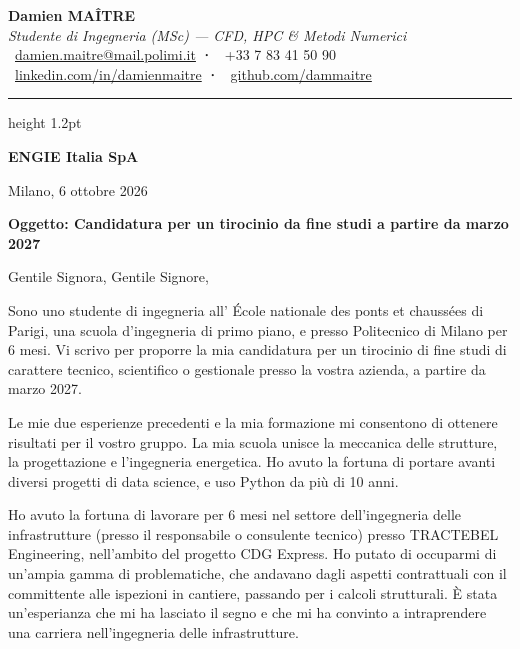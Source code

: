 \documentclass[a4paper,11pt]{extarticle}
\newcommand{\azienda}{ENGIE Italia SpA}
\begin{document}
\begin{center}
  {\LARGE\bfseries\color{accent} Damien MAÎTRE}\\[2pt]
  {\normalsize\textit{\textcolor{muted}{Studente di Ingegneria (MSc) — CFD, HPC \& Metodi Numerici}}}\\[4pt]
  \small
  \textcolor{muted}{
    \faEnvelope\ \href{mailto:damien.maitre@mail.polimi.it}{damien.maitre@mail.polimi.it}
    \quad\textbf{·}\quad
    \faPhone\ +33 7 83 41 50 90
    \\[1pt]
    \faLinkedin\ \href{https://linkedin.com/in/damienmaitre}{linkedin.com/in/damienmaitre}
    \quad\textbf{·}\quad
    \faGithub\ \href{https://github.com/dammaitre}{github.com/dammaitre}
  }
\end{center}

\vspace{2pt}
{\color{accent}\hrule height 1.2pt}
\vspace{10pt}

\begin{flushright}
  \textbf{\azienda}\\
\end{flushright}

\vspace{4pt}
Milano, 6 ottobre 2026

\vspace{4pt}
{\color{accent}\textbf{Oggetto: Candidatura per un tirocinio da fine studi a partire da marzo 2027}}

\vspace{4pt}
Gentile Signora, Gentile Signore,

Sono uno studente di ingegneria all' École nationale des ponts et chaussées di Parigi, una scuola d'ingegneria di primo piano, e presso Politecnico di Milano per 6 mesi. Vi scrivo per proporre la mia candidatura per un tirocinio di fine studi di carattere tecnico, scientifico o gestionale presso la vostra azienda, a partire da marzo 2027.

Le mie due esperienze precedenti e la mia formazione mi consentono di ottenere risultati per il vostro gruppo. La mia scuola unisce la meccanica delle strutture, la progettazione e l'ingegneria energetica. Ho avuto la fortuna di portare avanti diversi progetti di data science, e uso Python da più di 10 anni. 

Ho avuto la fortuna di lavorare per 6 mesi nel settore dell'ingegneria delle infrastrutture (presso il responsabile o consulente tecnico) presso TRACTEBEL Engineering, nell'ambito del progetto CDG Express. Ho putato di occuparmi di un'ampia gamma di problematiche, che andavano dagli aspetti contrattuali con il committente alle ispezioni in cantiere, passando per i calcoli strutturali. È stata un'esperianza che mi ha lasciato il segno e che mi ha convinto a intraprendere una carriera nell'ingegneria delle infrastrutture.
\end{document}
